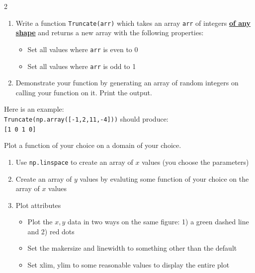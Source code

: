 \documentclass[12pt]{article}%
\newcommand{\code}[1]{\texttt{#1}}
\begin{document}
\begin{multicols*}{2}
\begin{Exercise}[origin={10 points, Python}]
\end{Exercise}


\begin{Exercise}[origin={10 points, Python}]

\begin{enumerate}[leftmargin=*]
	\item Write a function \code{Truncate(arr)} which takes an array \code{arr} of integers \underline{\textbf{of any shape}} and returns a new array with the following properties:
	\begin{itemize}
		\item Set all values where \code{arr} is even to 0
		\item Set all values where \code{arr} is odd to 1
	\end{itemize}
	\item Demonstrate your function by generating an array of random integers on calling your function on it. Print the output.
\end{enumerate}

Here is an example: \\ \code{Truncate(np.array([-1,2,11,-4]))} should produce: \\

\code{[1 0 1 0]}

\end{Exercise}


\begin{Exercise}[origin={20 points, Python}]

Plot a function of your choice on a domain of your choice.

\begin{enumerate}[leftmargin=*]
	\item Use \code{np.linspace} to create an array of $x$ values (you choose the parameters)
	\item Create an array of $y$ values by evaluting some function of your choice on the array of $x$ values
	\item Plot attributes
	\begin{itemize}
		\item Plot the $x,y$ data in two ways on the same figure: 1) a green dashed line and 2) red dots
		\item Set the makersize and linewidth to something other than the default
		\item Set xlim, ylim to some reasonable values to display the entire plot
	\end{itemize}
\end{enumerate}


\end{Exercise}
\end{multicols*}
\end{document}
